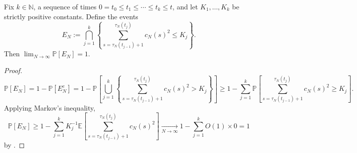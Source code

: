 \documentclass{article}
\newcommand{\Prob}{\mathbb{P}}
\newcommand{\E}{\mathbb{E}}
\newcommand{\1}[1]{\mathbbm{1}_{#1}}
\begin{document}


\begin{lemma}\label{thm:indicators_c2}
Fix $k\in\mathbb{N}$, a sequence of times $0 = t_0 \leq t_1 \leq \cdots \leq t_k \leq t$, and let $K_1,\dots,K_k$ be strictly positive constants.
Define the events
\begin{equation}
E_N := \bigcap_{j=1}^k \left\{ \sum_{s=\tau_N(t_{j-1})+1}^{\tau_N(t_j)}
        c_N(s)^2 \leq K_j \right\} .
\end{equation}
Then $\lim_{N\to\infty} \Prob[E_N] =1$.
\end{lemma}

\begin{proof}
\begin{equation}
\Prob[E_N]
= 1- \Prob[E_N^c]
= 1- \Prob\left[ \bigcup_{j=1}^k \left\{ \sum_{s=\tau_N(t_{j-1})+1}
        ^{\tau_N(t_j)} c_N(s)^2 > K_j \right\} \right] 
\geq 1- \sum_{j=1}^k \Prob\left[ \sum_{s=\tau_N(t_{j-1})+1}
        ^{\tau_N(t_j)} c_N(s)^2 \geq K_j \right] .
\end{equation}
Applying Markov's inequality,
\begin{equation}
\Prob[E_N]
\geq 1- \sum_{j=1}^k K_j^{-1} \E\left[ \sum_{s=\tau_N(t_{j-1})+1}
        ^{\tau_N(t_j)} c_N(s)^2 \right]
\underset{N\to\infty}{\longrightarrow} 1- \sum_{j=1}^k O(1) \times 0 
= 1
\end{equation}
by \citet[Equation (3.5)]{brown2021}.
\end{proof}
\end{document}
